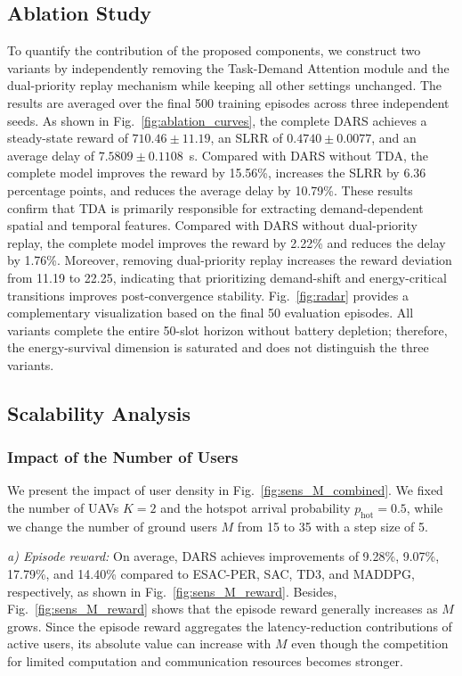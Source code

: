 \documentclass[journal]{IEEEtran}
\begin{document}
\subsection{Ablation Study}
To quantify the contribution of the proposed components, we construct two variants by independently removing the Task-Demand Attention  module and the dual-priority replay mechanism while keeping all other settings unchanged. The results are averaged over the final 500 training episodes across three independent seeds. As shown in Fig.~\ref{fig:ablation_curves}, the complete DARS achieves a steady-state reward of 
$710.46\pm11.19$, an SLRR of $0.4740\pm0.0077$, and an average delay of $7.5809\pm0.1108$~s. Compared with DARS without TDA, the complete model improves the reward by 15.56\%, increases the SLRR by 6.36 percentage points, and reduces the average delay by 10.79\%. These results confirm that TDA is primarily responsible for extracting demand-dependent spatial and temporal features. Compared with DARS without dual-priority replay, the complete model improves the reward by 2.22\% and reduces the delay by 1.76\%. Moreover, removing dual-priority replay increases the reward deviation from 11.19 to 22.25, indicating that prioritizing demand-shift and energy-critical transitions improves post-convergence stability.
Fig.~\ref{fig:radar} provides a complementary visualization based on the final 50 evaluation episodes. All variants complete the entire 50-slot horizon without battery depletion; therefore, the energy-survival dimension is saturated and does not distinguish the three variants.
\subsection{Scalability Analysis}


\subsubsection{Impact of the Number of Users}
We present the impact of user density in Fig.~\ref{fig:sens_M_combined}. We fixed the number of UAVs $K=2$ and the hotspot arrival probability $p_{\mathrm{hot}}=0.5$, while we change the number of ground users $M$ from 15 to 35 with a step size of 5.

\textit{a) Episode reward:}
On average, DARS achieves improvements of 9.28\%, 9.07\%, 17.79\%, and 14.40\% compared to ESAC-PER, SAC, TD3, and MADDPG, respectively, as shown in Fig.~\ref{fig:sens_M_reward}. Besides, Fig.~\ref{fig:sens_M_reward} shows that the episode reward generally increases as $M$ grows. Since the episode reward aggregates the latency-reduction contributions of active users, its absolute value can increase with $M$ even though the competition for limited computation and communication resources becomes stronger.
\end{document}
